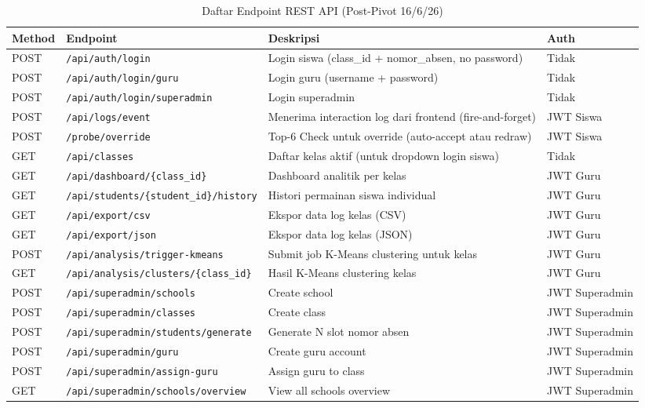 \documentclass[12pt,a4paper,oneside,openany]{report}
\begin{document}
\begin{table}[H]
\centering
\caption{Daftar Endpoint REST API (Post-Pivot 16/6/26)}
\label{tab:api-endpoints}
\begin{tabular}{|p{1.2cm}|p{4.5cm}|p{5.5cm}|p{2cm}|}
\hline
\textbf{Method} & \textbf{Endpoint} & \textbf{Deskripsi} & \textbf{Auth} \\ \hline
POST & \texttt{/api/auth/login} & Login siswa (class\_id + nomor\_absen, no password) & Tidak \\ \hline
POST & \texttt{/api/auth/login/guru} & Login guru (username + password) & Tidak \\ \hline
POST & \texttt{/api/auth/login/superadmin} & Login superadmin & Tidak \\ \hline
POST & \texttt{/api/logs/event} & Menerima interaction log dari frontend (fire-and-forget) & JWT Siswa \\ \hline
POST & \texttt{/probe/override} & Top-6 Check untuk override (auto-accept atau redraw) & JWT Siswa \\ \hline
GET & \texttt{/api/classes} & Daftar kelas aktif (untuk dropdown login siswa) & Tidak \\ \hline
GET & \texttt{/api/dashboard/\{class\_id\}} & Dashboard analitik per kelas & JWT Guru \\ \hline
GET & \texttt{/api/students/\{student\_id\}/history} & Histori permainan siswa individual & JWT Guru \\ \hline
GET & \texttt{/api/export/csv} & Ekspor data log kelas (CSV) & JWT Guru \\ \hline
GET & \texttt{/api/export/json} & Ekspor data log kelas (JSON) & JWT Guru \\ \hline
POST & \texttt{/api/analysis/trigger-kmeans} & Submit job K-Means clustering untuk kelas & JWT Guru \\ \hline
GET & \texttt{/api/analysis/clusters/\{class\_id\}} & Hasil K-Means clustering kelas & JWT Guru \\ \hline
POST & \texttt{/api/superadmin/schools} & Create school & JWT Superadmin \\ \hline
POST & \texttt{/api/superadmin/classes} & Create class & JWT Superadmin \\ \hline
POST & \texttt{/api/superadmin/students/generate} & Generate N slot nomor absen & JWT Superadmin \\ \hline
POST & \texttt{/api/superadmin/guru} & Create guru account & JWT Superadmin \\ \hline
POST & \texttt{/api/superadmin/assign-guru} & Assign guru to class & JWT Superadmin \\ \hline
GET & \texttt{/api/superadmin/schools/overview} & View all schools overview & JWT Superadmin \\ \hline
\end{tabular}
\end{table}
\end{document}
